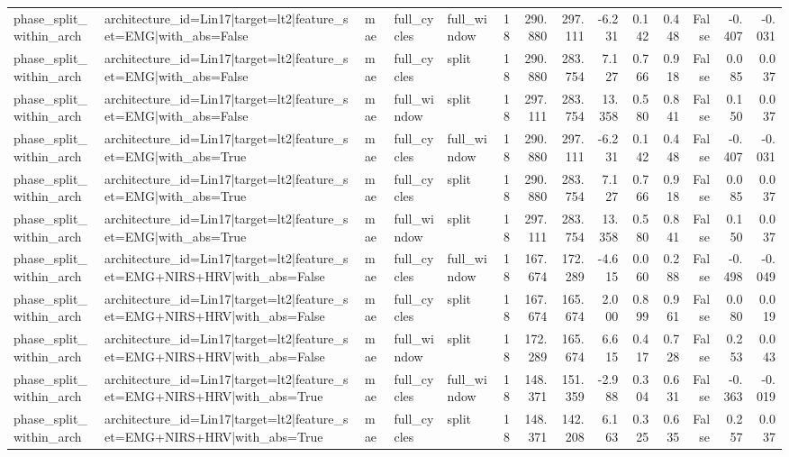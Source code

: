 \begin{table}
\begin{tabular}{lllllrrrrrrrrr}
phase_split_within_arch & architecture_id=Lin17|target=lt2|feature_set=EMG|with_abs=False & mae & full_cycles & full_window & 18 & 290.880 & 297.111 & -6.231 & 0.142 & 0.448 & False & -0.407 & -0.031 \\
phase_split_within_arch & architecture_id=Lin17|target=lt2|feature_set=EMG|with_abs=False & mae & full_cycles & split & 18 & 290.880 & 283.754 & 7.127 & 0.766 & 0.918 & False & 0.085 & 0.037 \\
phase_split_within_arch & architecture_id=Lin17|target=lt2|feature_set=EMG|with_abs=False & mae & full_window & split & 18 & 297.111 & 283.754 & 13.358 & 0.580 & 0.841 & False & 0.150 & 0.037 \\
phase_split_within_arch & architecture_id=Lin17|target=lt2|feature_set=EMG|with_abs=True & mae & full_cycles & full_window & 18 & 290.880 & 297.111 & -6.231 & 0.142 & 0.448 & False & -0.407 & -0.031 \\
phase_split_within_arch & architecture_id=Lin17|target=lt2|feature_set=EMG|with_abs=True & mae & full_cycles & split & 18 & 290.880 & 283.754 & 7.127 & 0.766 & 0.918 & False & 0.085 & 0.037 \\
phase_split_within_arch & architecture_id=Lin17|target=lt2|feature_set=EMG|with_abs=True & mae & full_window & split & 18 & 297.111 & 283.754 & 13.358 & 0.580 & 0.841 & False & 0.150 & 0.037 \\
phase_split_within_arch & architecture_id=Lin17|target=lt2|feature_set=EMG+NIRS+HRV|with_abs=False & mae & full_cycles & full_window & 18 & 167.674 & 172.289 & -4.615 & 0.060 & 0.288 & False & -0.498 & -0.049 \\
phase_split_within_arch & architecture_id=Lin17|target=lt2|feature_set=EMG+NIRS+HRV|with_abs=False & mae & full_cycles & split & 18 & 167.674 & 165.674 & 2.000 & 0.899 & 0.961 & False & 0.080 & 0.019 \\
phase_split_within_arch & architecture_id=Lin17|target=lt2|feature_set=EMG+NIRS+HRV|with_abs=False & mae & full_window & split & 18 & 172.289 & 165.674 & 6.615 & 0.417 & 0.728 & False & 0.253 & 0.043 \\
phase_split_within_arch & architecture_id=Lin17|target=lt2|feature_set=EMG+NIRS+HRV|with_abs=True & mae & full_cycles & full_window & 18 & 148.371 & 151.359 & -2.988 & 0.304 & 0.631 & False & -0.363 & -0.019 \\
phase_split_within_arch & architecture_id=Lin17|target=lt2|feature_set=EMG+NIRS+HRV|with_abs=True & mae & full_cycles & split & 18 & 148.371 & 142.208 & 6.163 & 0.325 & 0.635 & False & 0.257 & 0.037 \\

\end{tabular}
\end{table}
